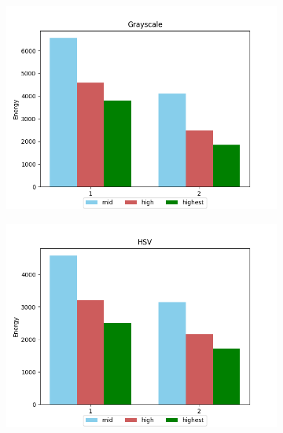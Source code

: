 \begin{figure}[htp]
    \caption{\label{fig:appendix_airplane_fft_results}Airplane FFT approach for (a) Grayscale, (b) HSV and (c) LAB images.}
    \centering
    \begin{subfigure}{.5\textwidth}
        \centering
        \includegraphics[scale=0.41]{images/appendix/fft/airplane/grayscale.png}
        \caption{}
    \end{subfigure}%
    \begin{subfigure}{.5\textwidth}
         \centering
          \includegraphics[scale=0.41]{images/appendix/fft/airplane/hsv.png}
          \caption{}
    \end{subfigure}
    \fautor
\end{figure}


